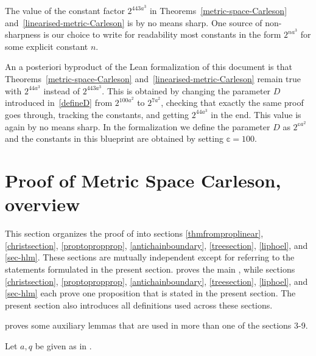 \begin{remark}
The value of the constant factor $2^{443a^3}$ in Theorems~\ref{metric-space-Carleson}
and~\ref{linearised-metric-Carleson} is by no means sharp.
One source of non-sharpness is our choice to write for readability most constants in the form $2^{na^3}$ for some explicit constant $n$.

An a posteriori byproduct of the Lean formalization of this document is that Theorems~\ref{metric-space-Carleson}
and~\ref{linearised-metric-Carleson} remain true with $2^{44a^3}$ instead of $2^{443a^3}$. This is obtained by
changing the parameter $D$ introduced in~\eqref{defineD} from $2^{100a^2}$ to $2^{7a^2}$, checking that exactly the same
proof goes through, tracking the constants, and getting $2^{44a^3}$ in the end. This value is again by no means sharp.
In the formalization we define the parameter $D$ as $2^{\mathbb{c}a^2}$
and the constants in this blueprint are obtained by setting $\mathbb{c} = 100$.
\end{remark}

\section{Proof of Metric Space Carleson, overview}
\label{overviewsection}

This section organizes the proof of  into sections \ref{thmfromproplinear}, \ref{christsection}, \ref{proptopropprop}, \ref{antichainboundary}, \ref{treesection}, \ref{liphoel}, and \ref{sec-hlm}. These sections are mutually independent except for referring to the statements formulated in the present section.  proves the main , while sections \ref{christsection}, \ref{proptopropprop}, \ref{antichainboundary}, \ref{treesection}, \ref{liphoel}, and \ref{sec-hlm} each prove one proposition that is stated in the present section. The present section also introduces all definitions used across these sections.

 proves some auxiliary lemmas that are used in more than one of the sections 3-9.

Let $a, q$ be given as in .




